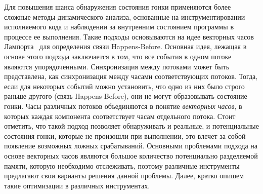 Для повышения шанса обнаружения состояния гонки применяются более сложные методы динамического анализа, основанные на инструментировании исполняемого кода и наблюдении за внутренним состоянием программы в процессе ее выполнения.
Такие подходы основываются на идее векторных часов Лампорта~\cite{Lamport} для определения связи Happens-Before.
Основная идея, лежащая в основе этого подхода заключается в том, что все события в одном потоке являются упорядоченными.
Синхронизация между потоками может быть представлена, как синхронизация между часами соответствующих потоков. 
Тогда, если для некоторых событий можно установить, что одно из них было строго раньше другого (связь Happens-Before), они не могут образовывать состояние гонки.
Часы различных потоков объединяются в понятие \textit{векторных часов}, в которых каждая компонента соответствует часам отдельного потока.
Стоит отметить, что такой подход позволяет обнаруживать и реальные, и потенциальные состояния гонки, которые не произошли при выполнении, это влечет за собой появление возможных ложных срабатываний.
Основными проблемами подхода на основе векторных часов являются большое количество потенциально разделяемой памяти, которую необходимо отслеживать, поэтому различные инструменты предлагают свои варианты решения данной проблемы.
Далее, кратко опишем такие оптимизации в различных инструментах.




